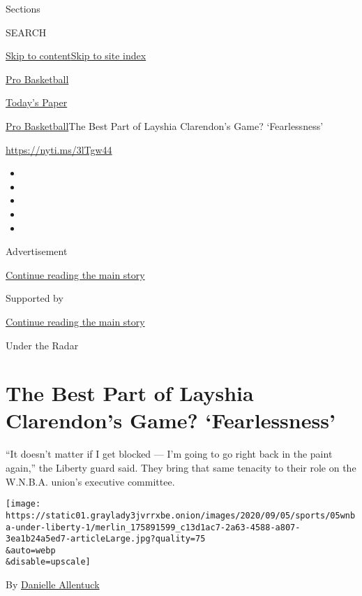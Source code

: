 Sections

SEARCH

\protect\hyperlink{site-content}{Skip to
content}\protect\hyperlink{site-index}{Skip to site index}

\href{https://www.nytimes3xbfgragh.onion/section/sports/basketball}{Pro
Basketball}

\href{https://myaccount.nytimes3xbfgragh.onion/auth/login?response_type=cookie\&client_id=vi}{}

\href{https://www.nytimes3xbfgragh.onion/section/todayspaper}{Today's
Paper}

\href{/section/sports/basketball}{Pro Basketball}\textbar{}The Best Part
of Layshia Clarendon's Game? `Fearlessness'

\url{https://nyti.ms/3lTgw44}

\begin{itemize}
\item
\item
\item
\item
\item
\end{itemize}

Advertisement

\protect\hyperlink{after-top}{Continue reading the main story}

Supported by

\protect\hyperlink{after-sponsor}{Continue reading the main story}

Under the Radar

\hypertarget{the-best-part-of-layshia-clarendons-game-fearlessness}{%
\section{The Best Part of Layshia Clarendon's Game?
`Fearlessness'}\label{the-best-part-of-layshia-clarendons-game-fearlessness}}

``It doesn't matter if I get blocked --- I'm going to go right back in
the paint again,'' the Liberty guard said. They bring that same tenacity
to their role on the W.N.B.A. union's executive committee.

\texttt{[image: https://static01.graylady3jvrrxbe.onion/images/2020/09/05/sports/05wnba-under-liberty-1/merlin\_175891599\_c13d1ac7-2a63-4588-a807-3ea1b24a5ed7-articleLarge.jpg?quality=75\\\&auto=webp\\\&disable=upscale]}

By
\href{https://www.nytimes3xbfgragh.onion/by/danielle-allentuck}{Danielle
Allentuck}

